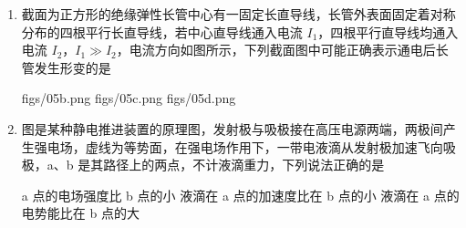 \documentclass[\gkver]{gaokaozhenti}
\begin{document}
\begin{enumerate}
{	B．由题知杆 OP 绕 O 点从与水平方向成 $30\Udu$ 匀速转动到 $60\Udu$，则 P 点绕 O 点做匀速圆周运动，P 点的加速度方向时刻指向 O 点，B 错误；

	C．Q 点在竖直方向的运动与 P 点相同，位移 $y$ 关于时间 $t$ 的关系为：$y=l_{OP}\sin\left(\frac{\pi}{6}+\omega t\right)$

	则可看出 Q 点在竖直方向不是匀速运动，C 错误；

	D．Q 点在水平方向的位移 $x$ 关于时间 $t$ 的关系为

	$x=l_{OP}\cos\left(\frac{\pi}{6}+\omega t\right)+l_{PQ}$

	则可看出 Q 点在水平方向也不是匀速运动，D 错误。

	故选 A。
}

\item
截面为正方形的绝缘弹性长管中心有一固定长直导线，长管外表面固定着对称分布的四根平行长直导线，若中心直导线通入电流 $I_{1}$，四根平行直导线均通入电流 $I_{2}$，$I_{1}\gg I_{2}$，电流方向如图所示，下列截面图中可能正确表示通电后长管发生形变的是 


{figs/05b.png}
{figs/05c.png}
{figs/05d.png}


\item
图是某种静电推进装置的原理图，发射极与吸极接在高压电源两端，两极间产生强电场，虚线为等势面，在强电场作用下，一带电液滴从发射极加速飞向吸极，a、b 是其路径上的两点，不计液滴重力，下列说法正确的是 


{a 点的电场强度比 b 点的小}
{液滴在 a 点的加速度比在 b 点的小}
{液滴在 a 点的电势能比在 b 点的大}


\end{enumerate}
\end{document}
